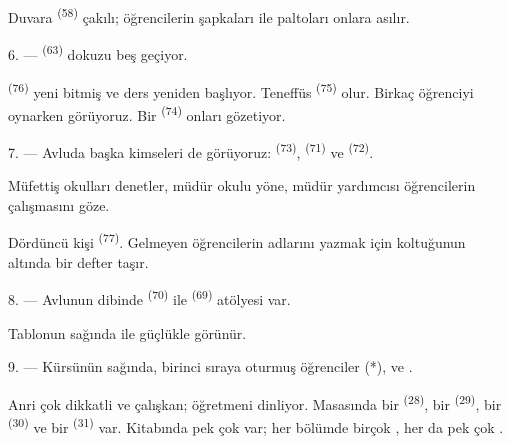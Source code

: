 Duvara  \textsuperscript{(58)} çakılı; öğrencilerin şapkaları
ile paltoları onlara asılır.

\VUsaut{5.2mm}
\VUsaut{3.6mm}

6. ---  \textsuperscript{(63)} dokuzu beş geçiyor.

 \textsuperscript{(76)} yeni bitmiş ve ders yeniden
başlıyor. Teneffüs  \textsuperscript{(75)} olur. Birkaç öğrenciyi
oynarken görüyoruz. Bir  \textsuperscript{(74)} onları
gözetiyor.

7. --- Avluda başka kimseleri de görüyoruz: 
\textsuperscript{(73)},  \textsuperscript{(71)} ve  \textsuperscript{(72)}.

Müfettiş okulları denetler, müdür okulu yöne, müdür yardımcısı öğrencilerin
çalışmasını göze.

Dördüncü kişi  \textsuperscript{(77)}. Gelmeyen öğrencilerin
adlarını yazmak için koltuğunun altında bir defter taşır.

8. --- Avlunun dibinde  \textsuperscript{(70)} ile
 \textsuperscript{(69)} atölyesi var.

Tablonun sağında  ile   güçlükle
görünür.


\VUsaut{2.4mm}

\VUsaut{3.0mm}

9. --- Kürsünün sağında, birinci sıraya oturmuş öğrenciler  (*),
 ve .

Anri çok dikkatli ve çalışkan; öğretmeni dinliyor. Masasında bir
 \textsuperscript{(28)}, bir 
\textsuperscript{(29)}, bir  \textsuperscript{(30)} ve bir
 \textsuperscript{(31)} var. Kitabında pek çok
 var; her bölümde birçok , her
 da pek çok .

